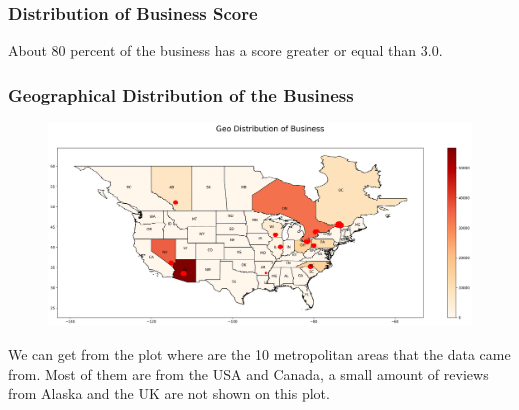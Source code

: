 \documentclass[12pt]{article}
\begin{document}
\subsubsection{Distribution of Business Score}
\begin{figure}[H]
\captionsetup[subfigure]{labelformat=empty}
\centering
{}
\end{figure}
About 80 percent of the business has a score greater or equal than 3.0.

\subsubsection{Geographical Distribution of the Business}
\begin{figure}[H]
\begin{center}
    \includegraphics[width=1.0\textwidth]{../05_dataMining/distributionBusinessGeo.png}
\end{center}
\end{figure}
We can get from the plot where are the 10 metropolitan areas that the data came from. Most of them are from the USA and Canada, a small amount of reviews from Alaska and the UK are not shown on this plot.
\end{document}
